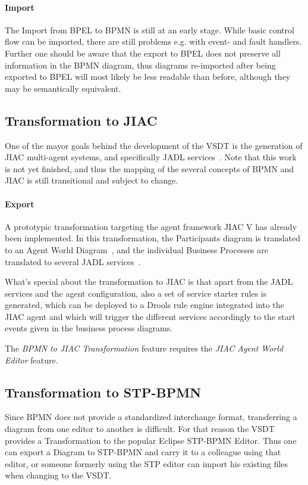 \paragraph{Import}
The Import from BPEL to BPMN is still at an early stage.  While basic control
flow can be imported, there are still problems e.g. with event- and fault handlers.
Further one should be aware that the export to BPEL does not preserve all
information in the BPMN diagram, thus diagrams re-imported after being exported
to BPEL will most likely be less readable than before, although they may be
semantically equivalent.


\subsection{Transformation to JIAC}
\label{sec:user_trafo_jiac}

One of the mayor goals behind the development of the VSDT is the generation of
JIAC multi-agent systems, and specifically JADL services~\cite{kuester2010integrating}.
Note that this work is not yet finished, and thus the mapping of the several
concepts of BPMN and JIAC is still transitional and subject to change.

\paragraph{Export}
A prototypic transformation targeting the agent framework JIAC V has already been
implemented.  In this transformation, the Participants diagram is translated to
an Agent World Diagram~\cite{lutzenberger2009unifying}, and the individual Business
Processes are translated to several JADL services~\cite{hirsch2010programming}.

What's special about the transformation to JIAC is that apart from the JADL
services and the agent configuration, also a set of service starter rules is
generated, which can be deployed to a Drools rule engine integrated into the JIAC
agent and which will trigger the different services accordingly to the start
events given in the business process diagrams.

The \emph{BPMN to JIAC Transformation} feature requires the \emph{JIAC Agent World
Editor} feature.


\subsection{Transformation to STP-BPMN}

Since BPMN does not provide a standardized interchange format, transferring a
diagram from one editor to another is difficult.  For that reason the VSDT provides
a Transformation to the popular Eclipse STP-BPMN Editor.  Thus one can export a
Diagram to STP-BPMN and carry it to a colleague using that editor, or someone
formerly using the STP editor can import his existing files when changing to the
VSDT.

